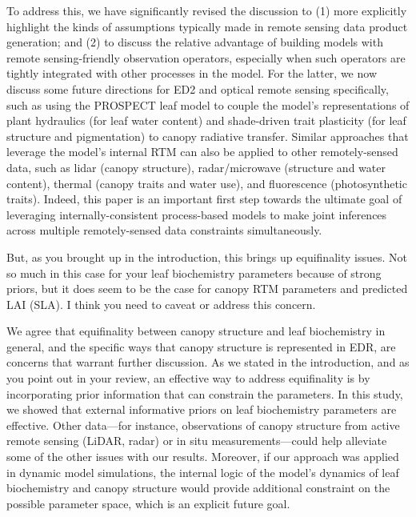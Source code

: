 To address this, we have significantly revised the discussion to (1) more explicitly highlight the kinds of assumptions typically made in remote sensing data product generation; and (2) to discuss the relative advantage of building models with remote sensing-friendly observation operators, especially when such operators are tightly integrated with other processes in the model. For the latter, we now discuss some future directions for ED2 and optical remote sensing specifically, such as using the PROSPECT leaf model to couple the model’s representations of plant hydraulics (for leaf water content) and shade-driven trait plasticity (for leaf structure and pigmentation) to canopy radiative transfer. Similar approaches that leverage the model’s internal RTM can also be applied to other remotely-sensed data, such as lidar (canopy structure), radar/microwave (structure and water content), thermal (canopy traits and water use), and fluorescence (photosynthetic traits). Indeed, this paper is an important first step towards the ultimate goal of leveraging internally-consistent process-based models to make joint inferences across multiple remotely-sensed data constraints simultaneously.

\begin{reviewer}
  But, as you brought up in the introduction, this brings up equifinality issues. Not so much in this case for your leaf biochemistry parameters because of strong priors, but it does seem to be the case for canopy RTM parameters and predicted LAI (SLA). I think you need to caveat or address this concern.
\end{reviewer}

We agree that equifinality between canopy structure and leaf biochemistry in general, and the specific ways that canopy structure is represented in EDR, are concerns that warrant further discussion. As we stated in the introduction, and as you point out in your review, an effective way to address equifinality is by incorporating prior information that can constrain the parameters. In this study, we showed that external informative priors on leaf biochemistry parameters are effective. Other data---for instance, observations of canopy structure from active remote sensing (LiDAR, radar) or in situ measurements---could help alleviate some of the other issues with our results. Moreover, if our approach was applied in dynamic model simulations, the internal logic of the model’s dynamics of leaf biochemistry and canopy structure would provide additional constraint on the possible parameter space, which is an explicit future goal.

